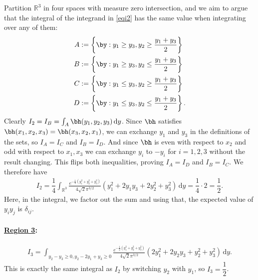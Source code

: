 \documentclass[11pt]{article}
\numberwithin{equation}{section}
\numberwithin{figure}{section}
\begin{document}
Partition $\mathbb R^3$ in four spaces with measure zero intersection, and we aim to argue that the integral of the integrand in \eqref{eqi2} has the same value when integrating over any of them: 
\begin{align*}
A &:= \left\{\by: y_1 \geq y_3, y_2 \geq \frac{y_1 + y_3}{2}\right\}\\
B &:= \left\{\by: y_1 \geq y_3, y_2 \leq \frac{y_1 + y_3}{2}\right\}\\
C &:= \left\{\by: y_1 \leq y_3, y_2 \geq \frac{y_1 + y_3}{2}\right\}\\
D &:= \left\{\by: y_1 \leq y_3, y_2 \leq \frac{y_1 + y_3}{2}\right\}.
\end{align*}
Clearly $I_2 = I_B = \int_A \bh(y_1, y_2, y_3) \, \mathrm{d}y$. Since $\bh$ satisfies $\bh(x_1, x_2, x_3) = \bh(x_3, x_2, x_1)$, we can exchange $y_1$ and $y_3$ in the definitions of the sets, so $I_A = I_C$ and $I_B = I_D$. And since $\bh$ is even with respect to $x_2$ and odd with respect to $x_1, x_3$ we can exchange $y_i$ to $-y_i$ for $i = 1,2,3$ without the result changing. This flips both inequalities, proving $I_A = I_D$ and $I_B = I_C$. We therefore have
\begin{align*}
    I_2 = \dfrac 1 4 \int_{\mathbb R^3}  \frac{e^{-\frac{1}{2}(y_1^2 + y_2^2 +y_3^2)}}{4 \sqrt{2} \pi ^{3/2}}  \left(y_1^2+2 y_1 y_3+2 y_2^2+y_3^2\right) \, \mathrm{d}y = \dfrac{1}{4} \cdot 2 = \dfrac 1 2.
\end{align*}
Here, in the integral, we factor out the sum and using that, the expected value of $y_iy_j$ is $\delta_{ij}$.
\paragraph{\underline{Region 3}:}
\begin{align*}
    I_3 = \int_{y_2-y_3\geq 0, y_2-2 y_1+y_3\geq 0 }  \frac{e^{-\frac{1}{2}(y_1^2 + y_2^2 +y_3^2)}}{4 \sqrt{2} \pi ^{3/2}}  \left(2y_1^2+2 y_2 y_3+y_2^2+y_3^2\right) \, \mathrm{d}y.
\end{align*}
This is exactly the same integral as $I_2$ by switching $y_2$ with $y_1$, so $I_3 = \dfrac 1 2$.
\end{document}
